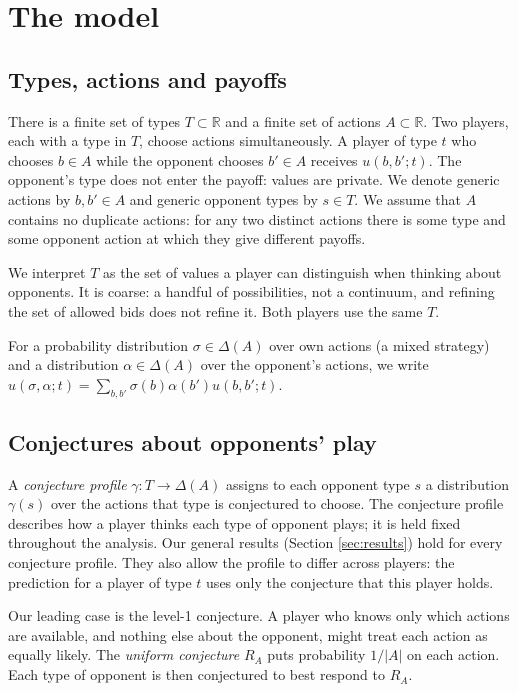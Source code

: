 \documentclass[12pt]{article}
\theoremstyle{definition}
\begin{document}
\section{The model}\label{sec:model}

\subsection{Types, actions and payoffs}

There is a finite set of types $T \subset \mathbb{R}$ and a finite set of actions $A \subset \mathbb{R}$. Two players, each with a type in $T$, choose actions simultaneously. A player of type $t$ who chooses $b \in A$ while the opponent chooses $b' \in A$ receives $u(b, b'; t)$. The opponent's type does not enter the payoff: values are private. We denote generic actions by $b, b' \in A$ and generic opponent types by $s \in T$. We assume that $A$ contains no duplicate actions: for any two distinct actions there is some type and some opponent action at which they give different payoffs.

We interpret $T$ as the set of values a player can distinguish when thinking about opponents. It is coarse: a handful of possibilities, not a continuum, and refining the set of allowed bids does not refine it. Both players use the same $T$.

For a probability distribution $\sigma \in \Delta(A)$ over own actions (a mixed strategy) and a distribution $\alpha \in \Delta(A)$ over the opponent's actions, we write $u(\sigma, \alpha; t) = \sum_{b, b'} \sigma(b)\alpha(b') u(b, b'; t)$.

\subsection{Conjectures about opponents' play}

A \emph{conjecture profile} $\gamma : T \to \Delta(A)$ assigns to each opponent type $s$ a distribution $\gamma(s)$ over the actions that type is conjectured to choose. The conjecture profile describes how a player thinks each type of opponent plays; it is held fixed throughout the analysis. Our general results (Section \ref{sec:results}) hold for every conjecture profile. They also allow the profile to differ across players: the prediction for a player of type $t$ uses only the conjecture that this player holds.

Our leading case is the level-1 conjecture. A player who knows only which actions are available, and nothing else about the opponent, might treat each action as equally likely. The \emph{uniform conjecture} $R_A$ puts probability $1/|A|$ on each action. Each type of opponent is then conjectured to best respond to $R_A$.
\end{document}
